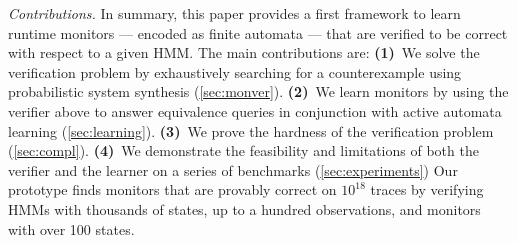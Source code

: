 \documentclass[runningheads]{llncs}
\renewcommand{\paragraph}[1]{\smallskip\noindent\emph{#1}}
\begin{document}
\paragraph{Contributions.}
In summary, this paper provides a first framework to learn runtime monitors --- encoded as finite automata --- that are verified to be correct with respect to a given HMM. The main contributions are:
\textbf{(1)}~We solve the verification problem by exhaustively searching for a counterexample using probabilistic system synthesis (\cref{sec:monver}).
\textbf{(2)}~We learn monitors by using the verifier above to answer equivalence queries in conjunction with active automata learning (\cref{sec:learning}).
\textbf{(3)}~We prove the hardness of the verification problem (\cref{sec:compl}).
\textbf{(4)}~We demonstrate the feasibility and limitations of both the verifier and the learner on a series of benchmarks (\cref{sec:experiments}) Our prototype finds monitors that are provably correct on $10^18$ traces by verifying HMMs with thousands of states, up to a hundred observations, and monitors with over 100 states.
%
%
\end{document}
